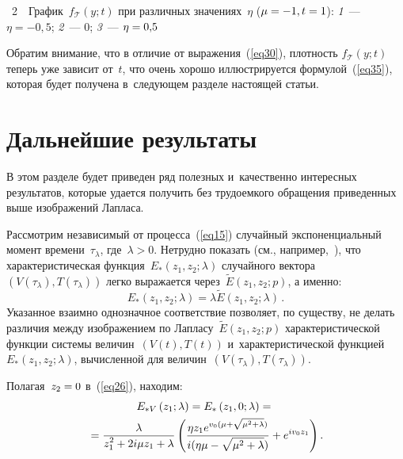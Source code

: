 \begin{multicols}{2}
\noindent
{{\figurename~2}\ \ \small{График~$f_{\mathcal{T}}(y; t)$ при различных значениях~$\eta$ ($\mu \hm= -1, t = 1$): \textit{1}~--- $\eta=-0{,}5$; \textit{2}~--- 0; \textit{3}~--- $\eta\hm=0{,}5$}}



\vspace*{18pt}


\addtocounter{figure}{1}




Обратим внимание, что в отличие от выражения~(\ref{eq30}),
плотность $f_{\mathcal{T}}(y; t)$ теперь уже зависит от~$t$, что очень хорошо иллюстрируется формулой~(\ref{eq35}), которая будет получена в~следующем разделе настоящей статьи.

\section{Дальнейшие результаты}

В этом разделе будет приведен ряд полезных и~качественно интересных результатов, которые удается получить без трудоемкого обращения приведенных выше изображений Лапласа.

Рассмотрим независимый от процесса~(\ref{eq15}) случайный экспоненциальный момент времени~$\tau_\lambda$, где~$\lambda>0$. Нетрудно показать (см., например,~\cite{ref24}), что характеристическая функция~$E_*(z_1, z_2; \lambda)$ случайного вектора~$(V(\tau_\lambda), T(\tau_\lambda))$ легко выражается через~$\tilde E(z_1,z_2; p)$, а именно:
\begin{equation}
  \label{eq31}
  E_*\left(z_1, z_2; \lambda\right) = \lambda \tilde E\left(z_1, z_2; \lambda\right)\,.
\end{equation}
Указанное взаимно однозначное соответствие позволяет, по существу, не делать различия между изображением по Лапласу~$\tilde E(z_1,z_2;p)$ характеристической функции системы величин~$(V(t), T(t))$ и~характеристической функцией~$E_*(z_1,z_2; \lambda)$, вычисленной для величин~$(V(\tau_\lambda), T(\tau_\lambda))$.

Полагая~$z_2\hm=0$ в~(\ref{eq26}), находим:
\begin{multline*}
    E_{*V}\left(z_1;\lambda\right) = E_*\left(z_1, 0;\lambda\right) = {}\\
    {}=\displaystyle\frac{\displaystyle \lambda\mathstrut}{\displaystyle z_1^2 +2i \mu   z_1 + \lambda\mathstrut} \left( \displaystyle\frac{\displaystyle \eta z_1 e^{v_0( \mu  +\sqrt{ \mu ^2 + \lambda})}\mathstrut}{\displaystyle i (\eta \mu -  \sqrt{\mu^2 + \lambda})\mathstrut}+ e^{i v_0 z_1} \right).
\end{multline*}


\end{multicols}

